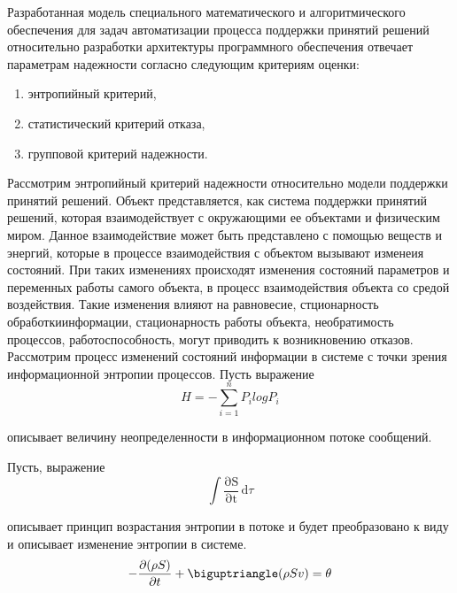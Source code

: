 Разработанная модель специального математического и алгоритмического обеспечения для задач автоматизации процесса поддержки принятий решений относительно разработки архитектуры программного обеспечения отвечает параметрам надежности согласно следующим критериям оценки:
\begin{enumerate}
    \item энтропийный критерий,
    \item статистический критерий отказа,
    \item групповой критерий надежности.
\end{enumerate}

Рассмотрим энтропийный критерий надежности относительно модели поддержки принятий решений. Объект представляется, как система поддержки принятий решений, которая взаимодействует с окружающими ее объектами и физическим миром. Данное взаимодействие может быть представлено с помощью веществ и энергий, которые в процессе взаимодействия с объектом вызывают изменеия состояний. При таких изменениях происходят изменения состояний параметров и переменных работы самого объекта, в процесс взаимодействия объекта со средой воздействия. Такие изменения влияют на равновесие, стционарность обработкиинформации, стационарность работы объекта, необратимость процессов, работоспособность, могут приводить к возникновению отказов. Рассмотрим процесс изменений состояний информации в системе с точки зрения информационной энтропии процессов.
Пусть выражение
\begin{equation}
    \label{eq:equation61}
     H = -\sum_{i=1}^n{P_ilogP_i}
\end{equation}

описывает величину неопределенности в информационном потоке сообщений.

Пусть, выражение
\begin{equation}
    \label{eq:equation62}
     \int \mathrm{\frac{\partial S}{\partial t}}\,\mathrm{d}\tau
\end{equation}

описывает принцип возрастания энтропии в потоке и будет преобразовано к виду и описывает изменение энтропии в системе.
\begin{equation}
    \label{eq:equation63}
     -\frac{\partial(\rho S)}{\partial t} + \biguptriangle (\rho S v) = \theta
\end{equation}

